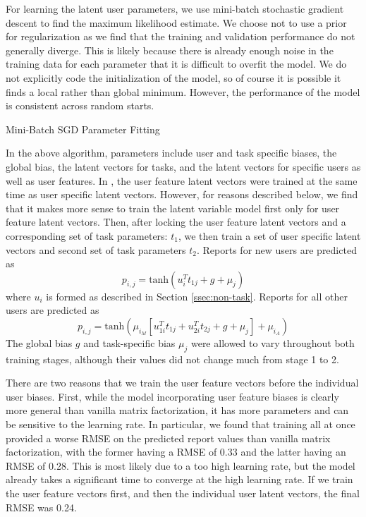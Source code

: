 \documentclass{article}
\begin{document}
For learning the latent user parameters, we use mini-batch stochastic gradient descent to find the maximum likelihood estimate. We choose not to use a prior for regularization as we find that the training and validation performance do not generally diverge. This is likely because there is already enough noise in the training data for each parameter that it is difficult to overfit the model. We do not explicitly code the initialization of the model, so of course it is possible it finds a local rather than global minimum. However, the performance of the model is consistent across random starts.

\begin{algorithm}
  \begin{algorithmic}
    \ENDFOR
    \ENDFOR
  \end{algorithmic}
  \caption{Mini-Batch SGD Parameter Fitting}
\end{algorithm}

In the above algorithm, parameters include user and task specific biases, the global bias, the latent vectors for tasks, and the latent vectors for specific users as well as user features. In \citep{kula2015metadata}, the user feature latent vectors were trained at the same time as user specific latent vectors. However, for reasons described below, we find that it makes more sense to train  the latent variable model first only for user feature latent vectors. Then, after locking the user feature latent vectors and a corresponding set of task parameters: $t_{1}$, we then train a set of user specific latent vectors and second set of task parameters $t_{2}$. Reports for new users are predicted as $$
  p_{i,j} = \textrm{tanh}\left(u_i^{T}t_{1j} + g + \mu_{j} \right)
 $$ where $u_{i}$ is formed as described in Section \ref{ssec:non-task}. Reports for all other users are predicted as $$p_{i,j} = \textrm{tanh}\left( \mu_{i_M}\left[u_{1i}^{T}t_{1j} + u_{2i}^{T}t_{2j} + g + \mu_j\right] + \mu_{i_A}\right)$$ The global bias $g$ and task-specific bias $\mu_{j}$ were allowed to vary throughout both training stages, although their values did not change much from stage 1 to 2. 

There are two reasons that we train the user feature vectors before the individual user biases. First, while the model incorporating user feature biases is clearly more general than vanilla matrix factorization, it has more parameters and can be sensitive to the learning rate. In particular, we found that training all at once provided a worse RMSE on the predicted report values than vanilla matrix factorization, with the former having a RMSE of 0.33 and the latter having an RMSE of 0.28. This is most likely due to a too high learning rate, but the model already takes a significant time to converge at the high learning rate. If we train the user feature vectors first, and then the individual user latent vectors, the final RMSE was 0.24. 
\end{document}
